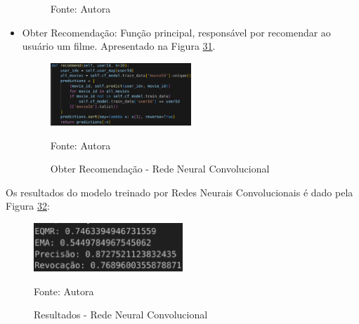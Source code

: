 \begin{itemize}
\begin{figure}[htbp]
        \vspace{2pt} %
        
        \small Fonte: Autora
    \end{figure}

    \item Obter Recomendação: Função principal, responsável por recomendar ao usuário um filme. Apresentado na Figura
    \hyperref[fig:recomend-cnn]{31}.
    \begin{figure}[htbp]
        \centering
        \caption{Obter Recomendação - Rede Neural Convolucional}
        \label{fig:recomend-cnn}
        
        \vspace{2pt} %
        
        \includegraphics[width=0.5\textwidth]{figuras/recomend-cnn.eps}
        
        \vspace{2pt} %
        
        \small Fonte: Autora
    \end{figure}

\end{itemize}

Os resultados do modelo treinado por Redes Neurais Convolucionais é dado pela Figura \hyperref[fig:cnn-5]{32}:
\begin{figure}[htbp]
    \centering
    \caption{Resultados - Rede Neural Convolucional}
    \label{fig:cnn-5}
    
    \vspace{2pt} %
    
    \includegraphics[width=0.5\textwidth]{figuras/cnn-5.eps}
    
    \vspace{2pt} %
    
    \small Fonte: Autora
\end{figure}

